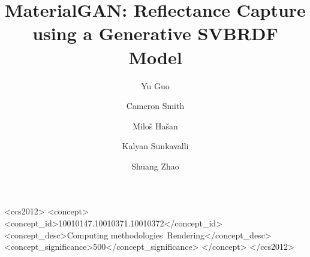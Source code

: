 \documentclass[acmtog]{acmart}
\title{MaterialGAN: Reflectance Capture using a Generative SVBRDF Model}
\author{Yu Guo}
\affiliation{\institution{University of California, Irvine}}
\author{Cameron Smith}
\affiliation{\institution{Adobe Research}}
\author{Milo\v{s} Ha\v{s}an}
\affiliation{\institution{Adobe Research}}
\author{Kalyan Sunkavalli}
\affiliation{\institution{Adobe Research}}
\author{Shuang Zhao}
\affiliation{\institution{University of California, Irvine}}
\begin{document}
    
    

	\begin{CCSXML}
		<ccs2012>
		  <concept>
    		<concept_id>10010147.10010371.10010372</concept_id>
    		<concept_desc>Computing methodologies~Rendering</concept_desc>
        	<concept_significance>500</concept_significance>
    	  </concept>
		</ccs2012>
	\end{CCSXML}



    \maketitle

    
    
    
    
    
    
    

    
    
\end{document}

